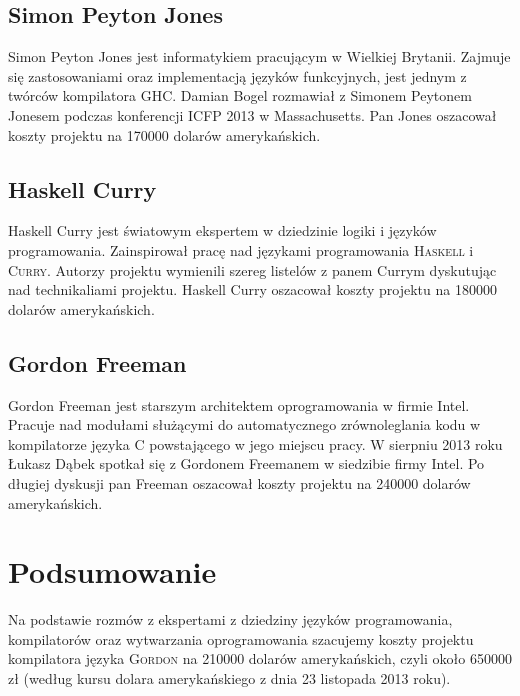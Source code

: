 \documentclass{documentation}
\begin{document}
\subsection{Simon Peyton Jones}
\noindent Simon Peyton Jones jest informatykiem pracującym w Wielkiej Brytanii. Zajmuje się zastosowaniami
oraz implementacją języków funkcyjnych, jest jednym z twórców kompilatora \textsc{GHC}.
Damian Bogel rozmawiał z Simonem Peytonem Jonesem podczas konferencji ICFP 2013 w Massachusetts.
Pan Jones oszacował koszty projektu na 170000 dolarów amerykańskich.

\subsection{Haskell Curry}
\noindent Haskell Curry jest światowym ekspertem w dziedzinie logiki i języków programowania.
Zainspirował pracę nad językami programowania \textsc{Haskell} i \textsc{Curry}.
Autorzy projektu wymienili szereg listelów z panem Currym dyskutując nad technikaliami
projektu. Haskell Curry oszacował koszty projektu na 180000 dolarów amerykańskich.

\subsection{Gordon Freeman}
\noindent Gordon Freeman jest starszym architektem oprogramowania w firmie Intel. Pracuje nad
modułami służącymi do automatycznego zrównoleglania kodu w kompilatorze języka \textsc{C}
powstającego w jego miejscu pracy. W sierpniu 2013 roku Łukasz Dąbek spotkał się
z Gordonem Freemanem w siedzibie firmy Intel. Po długiej dyskusji pan Freeman oszacował
koszty projektu na 240000 dolarów amerykańskich.

\section{Podsumowanie}
\noindent Na podstawie rozmów z ekspertami z dziedziny języków programowania, kompilatorów oraz
wytwarzania oprogramowania szacujemy koszty projektu kompilatora języka \textsc{Gordon}
na 210000 dolarów amerykańskich, czyli około 650000 zł (według kursu dolara amerykańskiego z
dnia 23 listopada 2013 roku).
\end{document}
